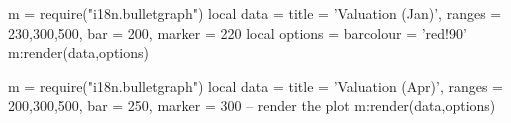 \begin{scriptexample}{}{}
\begin{bulletgraph}
  m = require("i18n.bulletgraph")
 local data = {
     title = 'Valuation (Jan)',
     ranges = {230,300,500},
     bar = 200,
     marker = 220}
     local options = {
        barcolour = 'red!90'
   } 
m:render(data,options)        
\end{bulletgraph}
\medskip

\begin{bulletgraph}
   m = require("i18n.bulletgraph")
   local data = {
      title = 'Valuation (Apr)',
      ranges = {200,300,500},
      bar = 250,
      marker = 300}
   -- render the plot
   m:render(data,options)           
\end{bulletgraph}
\end{scriptexample}

